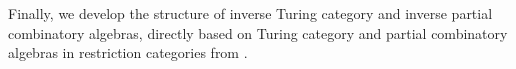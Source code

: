 Finally, we develop the structure of inverse Turing category and inverse partial combinatory
algebras, directly based on Turing category and partial combinatory algebras in restriction
categories from \cite{cockett-hostra08-intro-to-turing,cockett2010:categories-and-computability}.




